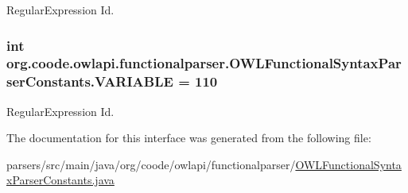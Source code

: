 Regular\-Expression Id. \hypertarget{interfaceorg_1_1coode_1_1owlapi_1_1functionalparser_1_1_o_w_l_functional_syntax_parser_constants_aea1915c758fa6537676d99ecb7bb2dc2}{
\subsubsection[{V\-A\-R\-I\-A\-B\-L\-E}]{\setlength{\rightskip}{0pt plus 5cm}int org.\-coode.\-owlapi.\-functionalparser.\-O\-W\-L\-Functional\-Syntax\-Parser\-Constants.\-V\-A\-R\-I\-A\-B\-L\-E = 110}}\label{interfaceorg_1_1coode_1_1owlapi_1_1functionalparser_1_1_o_w_l_functional_syntax_parser_constants_aea1915c758fa6537676d99ecb7bb2dc2}
Regular\-Expression Id. 

The documentation for this interface was generated from the following file\-:\begin{DoxyCompactItemize}
\item 
parsers/src/main/java/org/coode/owlapi/functionalparser/\hyperlink{_o_w_l_functional_syntax_parser_constants_8java}{O\-W\-L\-Functional\-Syntax\-Parser\-Constants.\-java}\end{DoxyCompactItemize}
